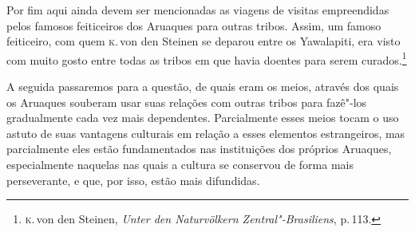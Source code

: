 Por fim aqui ainda devem ser mencionadas as viagens de visitas
empreendidas pelos famosos feiticeiros dos Aruaques para outras tribos.
Assim, um famoso feiticeiro, com quem \textsc{k}.\,von den Steinen se deparou
entre os Yawalapiti, era visto com muito gosto entre todas as tribos em
que havia doentes para serem curados.\footnote{\textsc{k}.\,von den Steinen,
  \textit{Unter den Naturvölkern Zentral"-Brasiliens}, p.\,113.}


A seguida passaremos para a questão, de quais eram os meios, através dos
quais os Aruaques souberam usar suas relações com outras tribos para
fazê"-los gradualmente cada vez mais dependentes. Parcialmente esses
meios tocam o uso astuto de suas vantagens culturais em relação a esses
elementos estrangeiros, mas parcialmente eles estão fundamentados nas
instituições dos próprios Aruaques, especialmente naquelas nas quais a
cultura se conservou de forma mais perseverante, e que, por isso, estão
mais difundidas.

